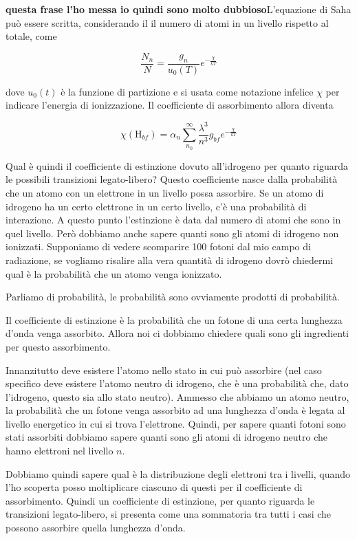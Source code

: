 \textbf{questa frase l'ho messa io quindi sono molto dubbioso}L'equazione di Saha può essere scritta, considerando il il numero di atomi in un livello rispetto al totale, come

$$\frac{N_n}{N}=\frac{g_n}{u_0(T)} e^{-\frac{\chi}{kT}}$$

dove $u_0(t)$ è la funzione di partizione e si usata come notazione infelice $\chi$ per indicare l'energia di ionizzazione. Il coefficiente di assorbimento allora diventa

\begin{equation*}
  \chi(\text{H}_{bf})= \alpha_n \sum_{n_0}^{\infty} \frac{\lambda^3}{n^3} g_{bf} e^{-\frac{\chi}{kT}}
\end{equation*}
 
Qual è quindi il coefficiente di estinzione dovuto all'idrogeno per quanto riguarda le possibili transizioni legato-libero? Questo coefficiente nasce dalla probabilità che un atomo con un elettrone in un livello possa assorbire. Se un atomo di idrogeno ha un certo elettrone in un certo livello, c'è una probabilità di interazione. A questo punto l'estinzione è data dal numero di atomi che sono in quel livello. Però dobbiamo anche sapere quanti sono gli atomi di idrogeno non ionizzati. Supponiamo di vedere scomparire 100 fotoni dal mio campo di radiazione, se vogliamo risalire alla vera quantità di idrogeno dovrò chiedermi qual è la probabilità che un atomo venga ionizzato.

Parliamo di probabilità, le probabilità sono ovviamente prodotti di probabilità.

Il coefficiente di estinzione è la probabilità che un fotone di una certa lunghezza d'onda venga assorbito. Allora noi ci dobbiamo chiedere quali sono gli ingredienti per questo assorbimento.

Innanzitutto deve esistere l'atomo nello stato in cui può assorbire (nel caso specifico deve esistere l'atomo neutro di idrogeno, che è una probabilità che, dato l'idrogeno, questo sia allo stato neutro). Ammesso che abbiamo un atomo neutro, la probabilità che un fotone venga assorbito ad una lunghezza d'onda è legata al livello energetico in cui si trova l'elettrone. Quindi, per sapere quanti fotoni sono stati assorbiti dobbiamo sapere quanti sono gli atomi di idrogeno neutro che hanno elettroni nel livello $n$.

Dobbiamo quindi sapere qual è la distribuzione degli elettroni tra i livelli, quando l'ho scoperta posso moltiplicare ciascuno di questi per il coefficiente di assorbimento. Quindi un coefficiente di estinzione, per quanto riguarda le transizioni legato-libero, si presenta come una sommatoria tra tutti i casi che possono assorbire quella lunghezza d'onda.

